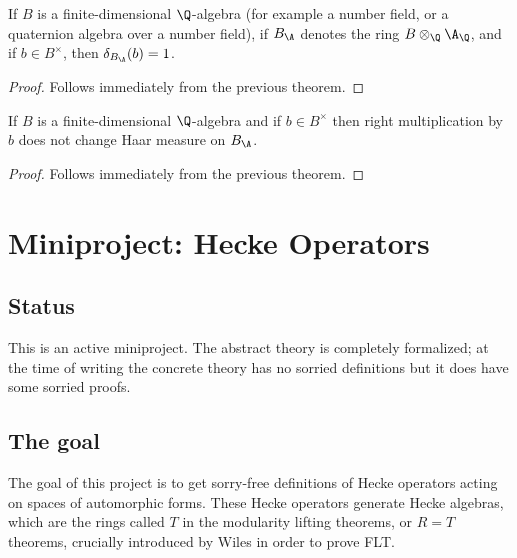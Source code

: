   \begin{corollary}
    \label{NumberField.AdeleRing.units_mem_ringHaarCharacter_ker}
    \leanok
    If $B$ is a finite-dimensional $\Q$-algebra (for example a number field, or a quaternion algebra over a number field),
    if $B_{\A}$ denotes the ring $B\otimes_{\Q}\A_{\Q}$, and if $b\in B^\times$,
    then $\delta_{B_{\A}}(b)=1$.
  \end{corollary}
  \begin{proof}
    \leanok
    Follows immediately from the previous theorem.
  \end{proof}

  \begin{corollary}
    \label{NumberField.AdeleRing.addEquivAddHaarChar_mulRight_unit_eq_one}
    \leanok
    If $B$ is a finite-dimensional $\Q$-algebra and
    if $b\in B^\times$ then right multiplication by $b$
    does not change Haar measure on $B_{\A}$.
  \end{corollary}
  \begin{proof}
    \leanok
    Follows immediately from the previous theorem.
  \end{proof}


\chapter{Miniproject: Hecke Operators}\label{HeckeOperator_project}

\section{Status}

This is an active miniproject. The abstract theory is completely formalized;
at the time of writing the concrete theory has no sorried definitions
but it does have some sorried proofs.

\section{The goal}

The goal of this project is to get sorry-free definitions of Hecke operators
acting on spaces of automorphic forms. These Hecke operators generate
Hecke algebras, which are the rings called $T$ in the modularity lifting theorems,
or $R=T$ theorems, crucially introduced by Wiles in order to prove FLT.

